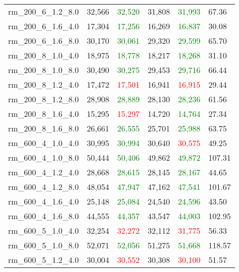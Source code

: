 \documentclass[11pt]{article}
\begin{document}
\begin{table}[H]
\begin{tabular}{l|l|l|l|l|l}
rm\_200\_6\_1.2\_8.0 & 32,566 & \textcolor{green}{32,520} & 31,808 & \textcolor{green}{31,993} & 67.36 \\
rm\_200\_6\_1.6\_4.0 & 17,304 & \textcolor{green}{17,256} & 16,269 & \textcolor{green}{16,837} & 30.08 \\
rm\_200\_6\_1.6\_8.0 & 30,170 & \textcolor{green}{30,061} & 29,320 & \textcolor{green}{29,599} & 65.70 \\
rm\_200\_8\_1.0\_4.0 & 18,975 & \textcolor{green}{18,778} & 18,217 & \textcolor{green}{18,268} & 31.10 \\
rm\_200\_8\_1.0\_8.0 & 30,490 & \textcolor{green}{30,275} & 29,453 & \textcolor{green}{29,716} & 66.44 \\
rm\_200\_8\_1.2\_4.0 & 17,472 & \textcolor{red}{17,501} & 16,941 & \textcolor{red}{16,915} & 29.44 \\
rm\_200\_8\_1.2\_8.0 & 28,908 & \textcolor{green}{28,889} & 28,130 & \textcolor{green}{28,236} & 61.56 \\
rm\_200\_8\_1.6\_4.0 & 15,295 & \textcolor{red}{15,297} & 14,720 & \textcolor{green}{14,764} & 27.34 \\
rm\_200\_8\_1.6\_8.0 & 26,661 & \textcolor{green}{26,555} & 25,701 & \textcolor{green}{25,988} & 63.75 \\
rm\_600\_4\_1.0\_4.0 & 30,995 & \textcolor{green}{30,994} & 30,640 & \textcolor{red}{30,575} & 49.25 \\
rm\_600\_4\_1.0\_8.0 & 50,444 & \textcolor{green}{50,406} & 49,862 & \textcolor{green}{49,872} & 107.31 \\
rm\_600\_4\_1.2\_4.0 & 28,668 & \textcolor{green}{28,615} & 28,145 & \textcolor{green}{28,167} & 44.65 \\
rm\_600\_4\_1.2\_8.0 & 48,054 & \textcolor{green}{47,947} & 47,162 & \textcolor{green}{47,541} & 101.67 \\
rm\_600\_4\_1.6\_4.0 & 25,148 & \textcolor{green}{25,084} & 24,540 & \textcolor{green}{24,596} & 43.50 \\
rm\_600\_4\_1.6\_8.0 & 44,555 & \textcolor{green}{44,357} & 43,547 & \textcolor{green}{44,003} & 102.95 \\
rm\_600\_5\_1.0\_4.0 & 32,254 & \textcolor{red}{32,272} & 32,112 & \textcolor{red}{31,775} & 56.33 \\
rm\_600\_5\_1.0\_8.0 & 52,071 & \textcolor{green}{52,056} & 51,275 & \textcolor{green}{51,668} & 118.57 \\
rm\_600\_5\_1.2\_4.0 & 30,004 & \textcolor{red}{30,552} & 30,308 & \textcolor{red}{30,100} & 51.57 \\

\end{tabular}
\end{table}
\end{document}
